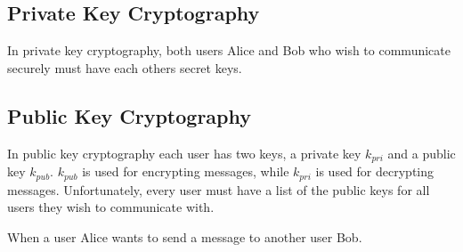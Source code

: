 \documentclass[12pt]{article}
\begin{document}
\subsection{Private Key Cryptography}
In private key cryptography, both users Alice and Bob who wish to communicate securely must have each others secret keys.
\subsection{Public Key Cryptography}
In public key cryptography each user has two keys, a private key $k_{pri}$ and a public key $k_{pub}$. $k_{pub}$ is used for encrypting messages, while $k_{pri}$ is used for decrypting messages. Unfortunately, every user must have a list of the public keys for all users they wish to communicate with.


When a user Alice wants to send a message to another user Bob.

\newpage


\end{document}
